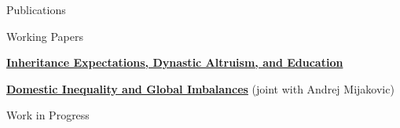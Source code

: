 \documentclass[5pt,a4paper]{article}
\begin{document}
\begin{cv}{}
\begin{cvlist}{Publications}
\begin{comment}
    \textbf{Conclusions}: Offering feedback of blood results increased willingness to give samples, especially for those taking part in a web survey.
\end{comment}
\end{cvlist}
\begin{cvlist}{Working Papers}
\item[] \normalsize
    \href{http://www.janmazza.com/Mazza_Inheritance_Expectations_Education.pdf}{\textbf{Inheritance Expectations, Dynastic Altruism, and Education}}\\
    \footnotesize 
    \item[] \normalsize
    \href{http://www.janmazza.com/Mazza_Mijakovic_Domestic_Inequality_Global_Imbalances.pdf}{\textbf{Domestic Inequality and Global Imbalances}} (joint with Andrej Mijakovic)\\    
    \footnotesize 
\end{cvlist}
\begin{cvlist}{Work in Progress}

\end{cvlist}
\end{cv}
\end{document}
